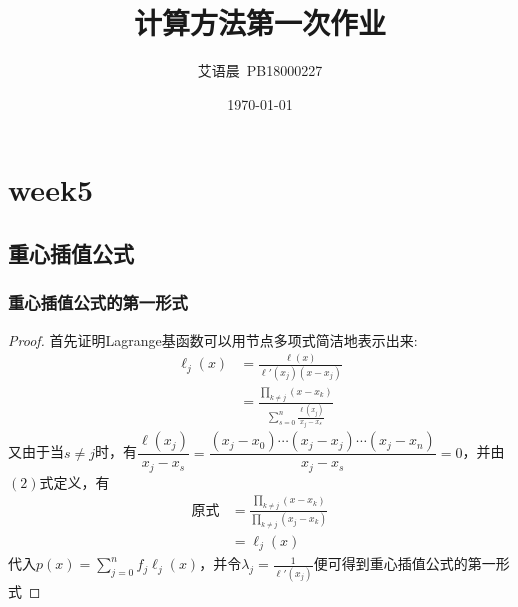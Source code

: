 \documentclass[]{report}
\title{{\huge {计算方法第一次作业}}}
\author{艾语晨~PB18000227}
\date{\today}
\begin{document}
\theoremstyle{definition} \newtheorem{theorem}{Thm}[section] %
\theoremstyle{definition} \newtheorem{definition}{Def}[section] %
\theoremstyle{plain} \newtheorem{lemma}{lemma}[section] %

	\maketitle
	\newpage

	\tableofcontents
	\newpage


	\chapter{week5}
	\section{重心插值公式}
		\subsection{重心插值公式的第一形式}
		\begin{proof}
			首先证明Lagrange基函数可以用节点多项式简洁地表示出来:
			\[\begin{aligned}
				\ell_j(x)&=\frac{\ell(x)}{\ell'(x_j)(x-x_j)}\\
				&=\frac{\prod_{k\neq j}(x-x_k)}{\sum_{s=0}^n\frac{\ell(x_j)}{x_j-x_s}}
			\end{aligned}\]
			又由于当$s\neq j$时，有$\dfrac{\ell(x_j)}{x_j-x_s}=\dfrac{(x_j-x_0)\cdots(x_j-x_j)\cdots(x_j-x_n)}{x_j-x_s}=0$，并由$(2)$式定义，有
			\[\begin{aligned}
				\mbox{原式}&=\frac{\prod_{k\neq j}(x-x_k)}{\prod_{k\neq j}(x_j-x_k)}\\
				&=\ell_j(x)
			\end{aligned}\]
			代入$p(x)=\sum_{j=0}^nf_j\ell_j(x)$，并令$\lambda_j=\frac{1}{\ell'(x_j)}$便可得到重心插值公式的第一形式
		\end{proof}
\end{document}
